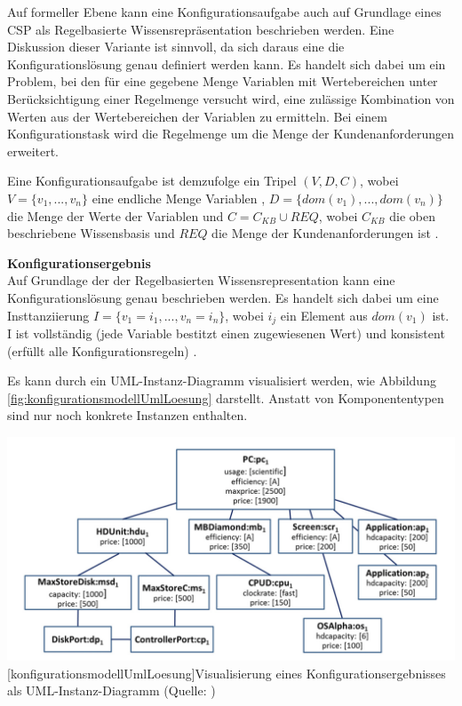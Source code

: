 \documentclass[12pt,a4paper,bibliography=totocnumbered,listof=totoc]{scrartcl}
\begin{document}
Auf formeller Ebene kann eine Konfigurationsaufgabe auch auf Grundlage eines \ac{CSP} als Regelbasierte Wissensrepräsentation beschrieben werden. Eine Diskussion dieser Variante ist sinnvoll, da sich daraus eine die Konfigurationslösung genau definiert werden kann. Es handelt sich dabei um ein Problem, bei den für eine gegebene Menge Variablen mit Wertebereichen unter Berücksichtigung einer Regelmenge versucht wird, eine zulässige Kombination von Werten aus der Wertebereichen der Variablen zu ermitteln. Bei einem Konfigurationstask wird die Regelmenge um die Menge der Kundenanforderungen erweitert.

Eine Konfigurationsaufgabe ist demzufolge ein Tripel $(V, D, C)$, wobei $V = \{v_1, ..., v_n\}$ eine endliche Menge Variablen ,  $D  = \{dom(v_1), ..., dom(v_n)\}$ die Menge der Werte der Variablen und $C = C_{KB} \cup REQ$, wobei $C_{KB}$ die oben beschriebene Wissensbasis und $REQ$ die Menge der Kundenanforderungen ist \citep{felferning14}.

\textbf{Konfigurationsergebnis}\\
Auf Grundlage der der Regelbasierten Wissensrepresentation kann eine Konfigurationslösung genau beschrieben werden. Es handelt sich dabei um eine Insttanziierung $I = \{v_1 = i_1, ..., v_n = i_n\}$, wobei $i_j$ ein Element aus $dom(v_1)$ ist. I ist vollständig (jede Variable bestitzt einen zugewiesenen Wert) und konsistent (erfüllt alle Konfigurationsregeln) \citep{falkner11}.

Es kann durch ein UML-Instanz-Diagramm visualisiert werden, wie Abbildung \ref{fig:konfigurationsmodellUmlLoesung} darstellt. Anstatt von Komponententypen sind nur noch konkrete Instanzen enthalten.

\vspace{1em}
\begin{minipage}{\linewidth}
	\centering
	\includegraphics[width=0.9\linewidth]{Abbildungen/konfigurationsmodellUmlLoesung.png}
	[konfigurationsmodellUmlLoesung]{Visualisierung eines Konfigurationsergebnisses als UML-Instanz-Diagramm (Quelle: \cite{felferning14})}
	\label{fig:konfigurationsmodellUmlLoesung}
\end{minipage}
\vspace{1em}
\end{document}
